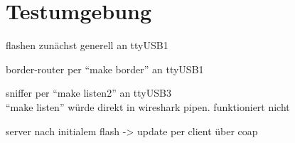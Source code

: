 \section{Testumgebung}

flashen zunächst generell an ttyUSB1

border-router per "`make border"' an ttyUSB1

sniffer per "`make listen2"' an ttyUSB3\\
"`make listen"' würde direkt in wireshark pipen. funktioniert nicht

server nach initialem flash -> update per client über coap